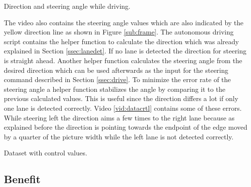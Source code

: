 \documentclass[conference]{IEEEtran}
\begin{document}
\begin{video}[h]
	\caption{Direction and steering angle while driving.}
	\label{vid:autodrive}
\end{video}

The video also contains the steering angle values which are also indicated by the yellow direction line as shown in Figure \ref{sub:frame}.
The autonomous driving script contains the helper function to calculate the direction which was already explained in Section \ref{ssec:lanedet}.
If no lane is detected the direction for steering is straight ahead.
Another helper function calculates the steering angle from the desired direction which can be used afterwards as the input for the steering command described in Section \ref{ssec:drive}.
To minimize the error rate of the steering angle a helper function stabilizes the angle by comparing it to the previous calculated values.
This is useful since the direction differs a lot if only one lane is detected correctly.
Video \ref{vid:datacrtl} contains some of these errors.
While steering left the direction aims a few times to the right lane because as explained before the direction is pointing towards the endpoint of the edge moved by a quarter of the picture width while the left lane is not detected correctly.

\begin{video}[h]
	\caption{Dataset with control values.}
	\label{vid:datacrtl}
\end{video}


\subsection{Benefit}
\end{document}
